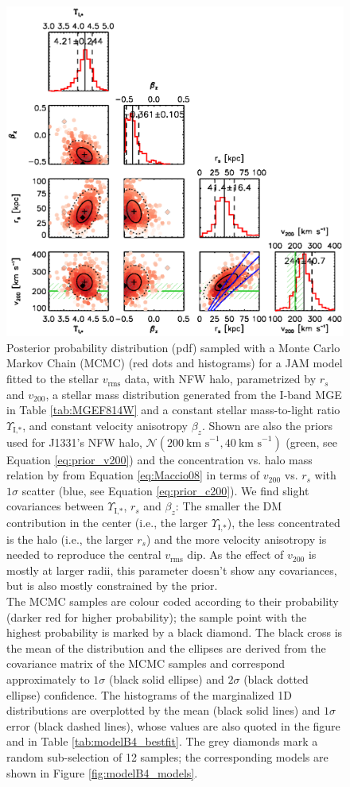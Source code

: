 \documentclass[useAMS,usenatbib]{mnras}
\begin{document}
\begin{figure}
\centering
\includegraphics[width=0.9\linewidth]{B4_contour_plot_short.ps}
\caption{Posterior probability distribution (pdf) sampled with a Monte Carlo Markov Chain (MCMC) (red dots and histograms) for a JAM model fitted to the stellar $v_\text{rms}$ data, with NFW halo, parametrized by $r_s$ and $v_\text{200}$, a stellar mass distribution generated from the I-band MGE in Table \ref{tab:MGEF814W} and a constant stellar mass-to-light ratio $\Upsilon_\text{I,*}$, and constant velocity anisotropy $\beta_z$. Shown are also the priors used for J1331's NFW halo, $\mathscr{N}(200~\text{km s}^{-1},40~\text{km s}^{-1})$ (green, see Equation \eqref{eq:prior_v200}) and the concentration vs. halo mass relation by \citet{Maccio08} from Equation \eqref{eq:Maccio08} in terms of $v_{200}$ vs. $r_s$ with $1\sigma$ scatter (blue, see Equation \eqref{eq:prior_c200}). We find slight covariances between $\Upsilon_\text{I,*}$,  $r_s$ and $\beta_z$: The smaller the DM contribution in the center (i.e., the larger $\Upsilon_\text{I,*}$), the less concentrated is the halo (i.e., the larger $r_s$) and the more velocity anisotropy is needed to reproduce the central $v_\text{rms}$ dip. As the effect of $v_{200}$ is mostly at larger radii, this parameter doesn't show any covariances, but is also mostly constrained by the prior.\\The MCMC samples are colour coded according to their probability (darker red for higher probability); the sample point with the highest probability is marked by a black diamond. The black cross is the mean of the distribution and the ellipses are derived from the covariance matrix of the MCMC samples and correspond approximately to $1\sigma$ (black solid ellipse) and $2\sigma$ (black dotted ellipse) confidence. The histograms of the marginalized 1D distributions are overplotted by the mean (black solid lines) and $1\sigma$ error (black dashed lines), whose values are also quoted in the figure and in Table \ref{tab:modelB4_bestfit}. The grey diamonds mark a random sub-selection of 12 samples; the corresponding models are shown in Figure \ref{fig:modelB4_models}.}
\label{fig:modelB4_triangle}
\end{figure}
\end{document}
